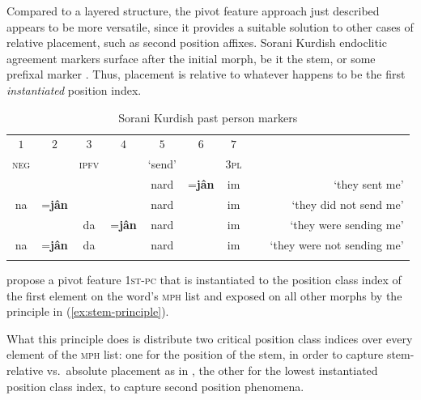 \documentclass[output=paper
 	        ,biblatex
                ,babelshorthands
                ,newtxmath
                ,draftmode
                ,colorlinks, citecolor=brown
]{langscibook}
\begin{document}
\begin{exe}
\begin{xlist}
\begin{exe}
\begin{xlist}
Compared to a layered structure, the pivot feature approach just
described appears to be more versatile, since it provides a suitable
solution to other cases of relative placement, such as second position
affixes. Sorani Kurdish endoclitic agreement markers surface after the
initial morph, be it the stem, or some prefixal marker
\citep{Samvelian07}. Thus, placement is relative to whatever happens
to be the first \textit{instantiated} position index.

\begin{table}
\centering
{\small
\begin{tabular}[t]{ccccccc|lr}
\lsptoprule
$1$ & $2$ & $3$ & $4$ & $5$ & $6$ & $7$ &\\
\textsc{neg} & & \textsc{ipfv} & & `send' & & \textsc{3pl}\\   
\midrule
    &&      && nard &=\textbf{jân} & im & ~ &{`they sent me'}\\
na & =\textbf{jân}     &  & & nard & & im & ~ &{`they did not send me'}\\
   & & da & =\textbf{jân} & nard & & im & ~ &{`they were sending me'}\\
na & =\textbf{jân}     &  da  & & nard & & im & ~ & {`they were not sending me'}\\
\lspbottomrule
\end{tabular}
}
\caption{Sorani Kurdish past person markers\label{table-kurdish}}
\label{tab:Sorani}
\end{table}

\citet{bonami_o-crysmann_b13hpsg} propose a pivot feature \textsc{1st-pc} that is
instantiated to the position class index of the first element on the
word's \textsc{mph} list and exposed on all other morphs by the
principle in (\ref{ex:stem-principle}).

\begin{exe}
  \ex\label{ex:stem-principle}
\end{exe}

What this principle does is distribute two critical position class
indices over every element of the \textsc{mph} list: one for the
position of the stem, in order to capture stem-relative vs.\ absolute placement as
in , the other for the lowest instantiated position class index,
to capture second position phenomena. 


\end{xlist}
\end{exe}
\end{xlist}
\end{exe}
\end{document}
